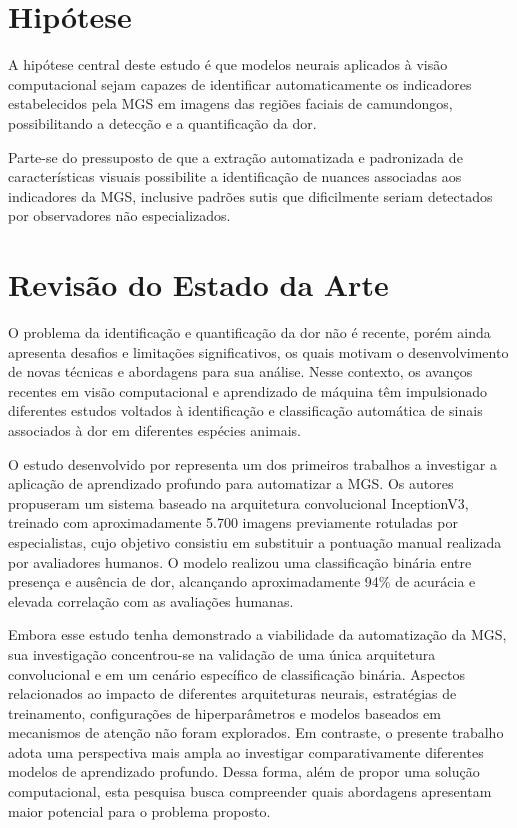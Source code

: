\section{Hipótese}

A hipótese central deste estudo é que modelos neurais aplicados à visão computacional sejam capazes de identificar automaticamente os indicadores estabelecidos pela \acs{MGS} em imagens das regiões faciais de camundongos, possibilitando a detecção e a quantificação da dor.

Parte-se do pressuposto de que a extração automatizada e padronizada de características visuais possibilite a identificação de nuances associadas aos indicadores da \acs{MGS}, inclusive padrões sutis que dificilmente seriam detectados por observadores não especializados.

\section{Revisão do Estado da Arte}

O problema da identificação e quantificação da dor não é recente, porém ainda apresenta desafios e limitações significativos, os quais motivam o desenvolvimento de novas técnicas e abordagens para sua análise. Nesse contexto, os avanços recentes em visão computacional e aprendizado de máquina têm impulsionado diferentes estudos voltados à identificação e classificação automática de sinais associados à dor em diferentes espécies animais.

O estudo desenvolvido por \cite{Tuttle2018DNNPain} representa um dos primeiros trabalhos a investigar a aplicação de aprendizado profundo para automatizar a \acs{MGS}. Os autores propuseram um sistema baseado na arquitetura convolucional InceptionV3, treinado com aproximadamente 5.700 imagens previamente rotuladas por especialistas, cujo objetivo consistiu em substituir a pontuação manual realizada por avaliadores humanos. O modelo realizou uma classificação binária entre presença e ausência de dor, alcançando aproximadamente 94\% de acurácia e elevada correlação com as avaliações humanas.

Embora esse estudo tenha demonstrado a viabilidade da automatização da MGS, sua investigação concentrou-se na validação de uma única arquitetura convolucional e em um cenário específico de classificação binária. Aspectos relacionados ao impacto de diferentes arquiteturas neurais, estratégias de treinamento, configurações de hiperparâmetros e modelos baseados em mecanismos de atenção não foram explorados. Em contraste, o presente trabalho adota uma perspectiva mais ampla ao investigar comparativamente diferentes modelos de aprendizado profundo. Dessa forma, além de propor uma solução computacional, esta pesquisa busca compreender quais abordagens apresentam maior potencial para o problema proposto.

